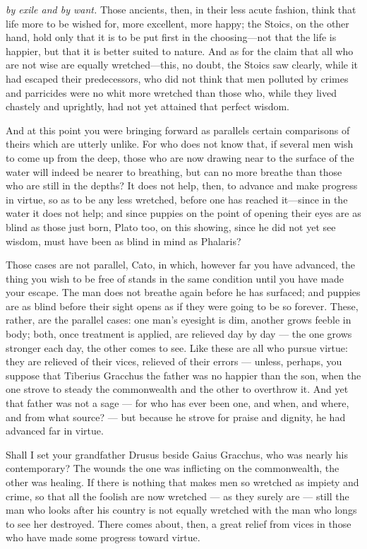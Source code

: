  \textit{by exile and by want.} Those ancients, then, in their less acute fashion, think that life more to be wished for, more excellent, more happy; the Stoics, on the other hand, hold only that it is to be put first in the choosing—not that the life is happier, but that it is better suited to nature. And as for the claim that all who are not wise are equally wretched—this, no doubt, the Stoics saw clearly, while it had escaped their predecessors, who did not think that men polluted by crimes and parricides were no whit more wretched than those who, while they lived chastely and uprightly, had not yet attained that perfect wisdom.

 And at this point you were bringing forward as parallels certain comparisons of theirs which are utterly unlike. For who does not know that, if several men wish to come up from the deep, those who are now drawing near to the surface of the water will indeed be nearer to breathing, but can no more breathe than those who are still in the depths? It does not help, then, to advance and make progress in virtue, so as to be any less wretched, before one has reached it—since in the water it does not help; and since puppies on the point of opening their eyes are as blind as those just born, Plato too, on this showing, since he did not yet see wisdom, must have been as blind in mind as Phalaris?

 Those cases are not parallel, Cato, in which, however far you have advanced, the thing you wish to be free of stands in the same condition until you have made your escape. The man does not breathe again before he has surfaced; and puppies are as blind before their sight opens as if they were going to be so forever. These, rather, are the parallel cases: one man's eyesight is dim, another grows feeble in body; both, once treatment is applied, are relieved day by day — the one grows stronger each day, the other comes to see. Like these are all who pursue virtue: they are relieved of their vices, relieved of their errors — unless, perhaps, you suppose that Tiberius Gracchus the father was no happier than the son, when the one strove to steady the commonwealth and the other to overthrow it. And yet that father was not a sage — for who has ever been one, and when, and where, and from what source? — but because he strove for praise and dignity, he had advanced far in virtue.

 Shall I set your grandfather Drusus beside Gaius Gracchus, who was nearly his contemporary? The wounds the one was inflicting on the commonwealth, the other was healing. If there is nothing that makes men so wretched as impiety and crime, so that all the foolish are now wretched — as they surely are — still the man who looks after his country is not equally wretched with the man who longs to see her destroyed. There comes about, then, a great relief from vices in those who have made some progress toward virtue.

